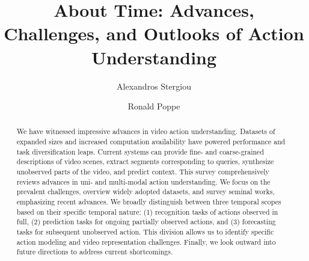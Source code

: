 \documentclass[smallextended,twocolumn,natbib]{svjour3}
\begin{document}
\sloppy

\title{About Time: Advances, Challenges, and Outlooks of Action Understanding}




\author{Alexandros Stergiou \and Ronald Poppe}


\maketitle

\begin{abstract}
We have witnessed impressive advances in video action understanding. Datasets of expanded sizes and increased computation availability have powered performance and task diversification leaps. Current systems can provide fine- and coarse-grained descriptions of video scenes, extract segments corresponding to queries, synthesize unobserved parts of the video, and predict context. This survey comprehensively reviews advances in uni- and multi-modal action understanding. We focus on the prevalent challenges, overview widely adopted datasets, and survey seminal works, emphasizing recent advances. We broadly distinguish between three temporal scopes based on their specific temporal nature: (1) recognition tasks of actions observed in full, (2) prediction tasks for ongoing partially observed actions, and (3) forecasting tasks for subsequent unobserved action. This division allows us to identify specific action modeling and video representation challenges. Finally, we look outward into future directions to address current shortcomings.

\end{abstract}
\end{document}

